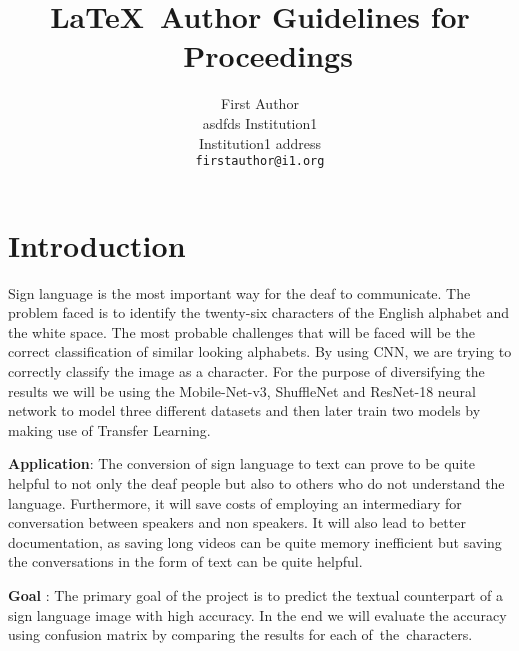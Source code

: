 \documentclass[10pt,twocolumn,letterpaper]{article}
\begin{document}
  \title{\LaTeX\ Author Guidelines for \confName~Proceedings}

  \author{First Author\\ asdfds
  Institution1\\
  Institution1 address\\
  {\tt\small firstauthor@i1.org}
  }
  \maketitle


  \section{Introduction}
  \label{sec:intro}

Sign language is the most important way for the deaf to communicate. The problem faced is to identify the twenty-six characters of the English alphabet and the white space. The most probable challenges that will be faced will be the correct classification of similar looking alphabets. By using CNN, we are trying to correctly classify the image as a character. For the purpose of diversifying the results we will be using the Mobile-Net-v3, ShuffleNet and ResNet-18 neural network to model three different datasets and then later train two models by making use of Transfer Learning.
\par
{\bfseries Application}: The conversion of sign language to text can prove to be quite helpful to not only the deaf people but also to others who do not understand the language. Furthermore, it will save costs of employing an intermediary for conversation between speakers and non speakers. It will also lead to better documentation, as saving long videos can be quite memory inefficient but saving the conversations in the form of text can be quite helpful.
\par
{\bfseries Goal} : The primary goal of the project is to predict the textual counterpart of a sign language image with high accuracy. In the end we will evaluate the accuracy using confusion matrix by comparing the results for each of the characters.
\end{document}
